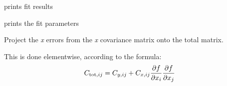 \documentclass[letterpaper,10pt,english]{sphinxmanual}
\begin{document}
\begin{fulllineitems}
\begin{fulllineitems}
\label{api/kafe:kafe.fit.Fit.print_fit_results}
prints fit results

\end{fulllineitems}


\begin{fulllineitems}
\label{api/kafe:kafe.fit.Fit.print_rounded_fit_parameters}
prints the fit parameters

\end{fulllineitems}


\begin{fulllineitems}
\label{api/kafe:kafe.fit.Fit.project_x_covariance_matrix}
Project the \emph{x} errors from the \emph{x} covariance matrix onto the total matrix.

This is done elementwise, according to the formula:
\begin{gather}
\begin{split}C_{\text{tot},ij} = C_{y,ij} + C_{x,ij}  \frac{\partial f}{\partial x_i}  \frac{\partial f}{\partial x_j} \end{split}\notag
\end{gather}
\end{fulllineitems}


\end{fulllineitems}

\end{document}
